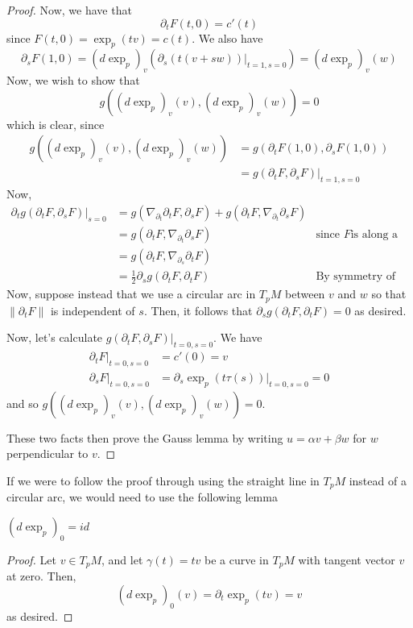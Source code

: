 \documentclass[../main.tex]{subfiles}
\begin{document}
\begin{proof}
    Now, we have that
    \[
        \partial_t F(t,0) = c'(t)
    \]
    since $F(t,0) = \exp_p(tv) = c(t)$. We also have
    \[
        \partial_s F(1,0) = (d\exp_p)_v(\partial_s(t(v+sw))|_{t=1,s=0}) =
        (d\exp_p)_v(w)
    \]
    Now, we wish to show that
    \[
        g((d\exp_p)_v(v),(d\exp_p)_v(w)) = 0
    \]
    which is clear, since
    \[
        \begin{aligned}
            g((d\exp_p)_v(v),(d\exp_p)_v(w))
            &= g(\partial_t F(1,0),\partial_s F(1,0))\\
            &= g(\partial_t F,\partial_s F)|_{t=1,s=0}
        \end{aligned}
    \]
    Now,
    \[
        \begin{aligned}
            \partial_t g(\partial_tF,\partial_sF)|_{s=0} &= g(\nabla_{\partial_t}\partial_t
        F,\partial_s F) + g(\partial_t F,\nabla_{\partial_t}\partial_s F)\\
            &= g(\partial_t F,\nabla_{\partial_t}\partial_s F) &\text{since $F$
            is along a geodesic, second derivatives vanish}\\
            &= g(\partial_t F,\nabla_{\partial_s}\partial_t F)\\
            &= \frac{1}{2}\partial_s g(\partial_t F,\partial_tF) &\text{By
            symmetry of the metric}
        \end{aligned}
    \]
    Now, suppose instead that we use a circular arc in $T_pM$ between $v$ and
    $w$ so that $\|\partial_t F\|$ is independent of $s$. Then, it follows that
    $\partial_s g(\partial_t F,\partial_t F) = 0$ as desired.

    Now, let's calculate $g(\partial_t F,\partial_sF)|_{t=0,s=0}$.
    We have
    \[
        \begin{aligned}
            \partial_t F|_{t=0,s=0} &= c'(0) = v\\
            \partial_s F|_{t=0,s=0} &=\partial_s\exp_p(t\tau(s))|_{t=0,s=0}=0
        \end{aligned}
    \]
    and so $g((d\exp_p)_v(v),(d\exp_p)_v(w)) = 0$.

    These two facts then prove the Gauss lemma by writing $u = \alpha v+\beta
    w$ for $w$ perpendicular to $v$. 
\end{proof}

If we were to follow the proof through using the straight line in $T_pM$ instead
of a circular arc, we would need to use the following lemma
\begin{lemma}
    $(d\exp_p)_0 = id$
\end{lemma}
\begin{proof}
    Let $v\in T_pM$, and let $\gamma(t) = tv$ be a curve in $T_pM$ with tangent
    vector $v$ at zero. Then,
    \[
        (d\exp_p)_0(v) = \partial_t\exp_p(tv) = v
    \]
    as desired.
\end{proof}
\end{document}
